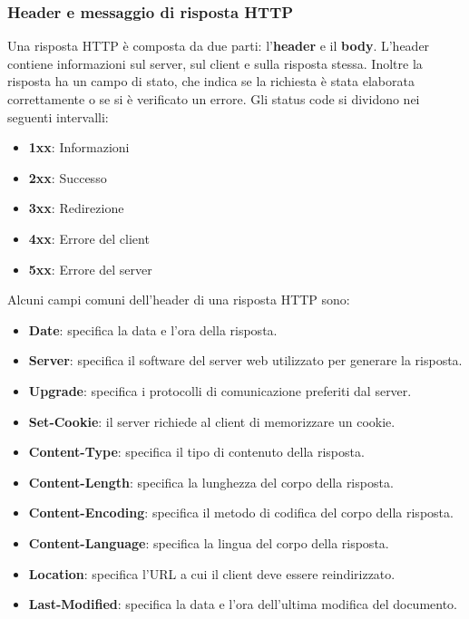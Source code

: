 \documentclass[12pt]{report}
\begin{document}
	\subsubsection{Header e messaggio di risposta HTTP}
	Una risposta HTTP è composta da due parti: l'\textbf{header} e il \textbf{body}. L'header contiene informazioni sul server, sul client e sulla risposta stessa. Inoltre la risposta ha un campo di stato, che indica se la richiesta è stata elaborata correttamente o se si è verificato un errore. Gli status code si dividono nei seguenti intervalli:
	\begin{itemize}
		\item \textbf{1xx}: Informazioni
		\item \textbf{2xx}: Successo
		\item \textbf{3xx}: Redirezione
		\item \textbf{4xx}: Errore del client
		\item \textbf{5xx}: Errore del server
	\end{itemize}
	Alcuni campi comuni dell'header di una risposta HTTP sono:
	\begin{itemize}
		\item \textbf{Date}: specifica la data e l'ora della risposta.
		\item \textbf{Server}: specifica il software del server web utilizzato per generare la risposta.
		\item \textbf{Upgrade}: specifica i protocolli di comunicazione preferiti dal server.
		\item \textbf{Set-Cookie}: il server richiede al client di memorizzare un cookie.
		\item \textbf{Content-Type}: specifica il tipo di contenuto della risposta.
		\item \textbf{Content-Length}: specifica la lunghezza del corpo della risposta.
		\item \textbf{Content-Encoding}: specifica il metodo di codifica del corpo della risposta.
		\item \textbf{Content-Language}: specifica la lingua del corpo della risposta.
		\item \textbf{Location}: specifica l'URL a cui il client deve essere reindirizzato.
		\item \textbf{Last-Modified}: specifica la data e l'ora dell'ultima modifica del documento.
	\end{itemize}
\end{document}
